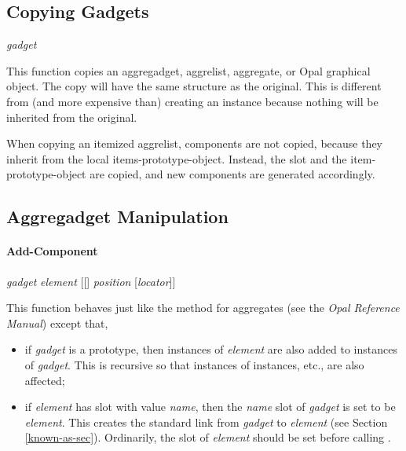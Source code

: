 \subsection{Copying Gadgets}
 {\it gadget}\value{function}

This function copies an aggregadget, aggrelist, aggregate, or Opal graphical
object.  The copy will have the same structure as the original.  This is
different from (and more expensive than) creating an instance because
nothing will be inherited from the original.

When copying an itemized aggrelist, components are not copied, because they
inherit from the local items-prototype-object.  Instead, the 
slot and the item-prototype-object are copied, and new components are generated
accordingly.


\begin{group}
\subsection{Aggregadget Manipulation}
\paragraph{Add-Component}
\label{add-component-sec}

\vspace{1 line}
 {\it gadget} {\it element} [[] {\it position} [{\it locator}]]\value{method}
\end{group}
\vspace{1 line}

This function behaves just like the  method for
aggregates (see the {\it Opal Reference
Manual}) except that,
\begin{itemize}
\item if {\it gadget} is a prototype, then instances of
{\it element} are also added to instances of {\it gadget}.  This is recursive
so that instances of instances, etc., are also affected;

\item if {\it element} has slot  with value {\it name}, then the
{\it name} slot of {\it gadget} is set to be {\it element}.  This creates
the standard link from {\it gadget} to {\it element} (see Section
\ref{known-as-sec}).  Ordinarily, the  slot of {\it element}
should be set before calling .
\end{itemize}

